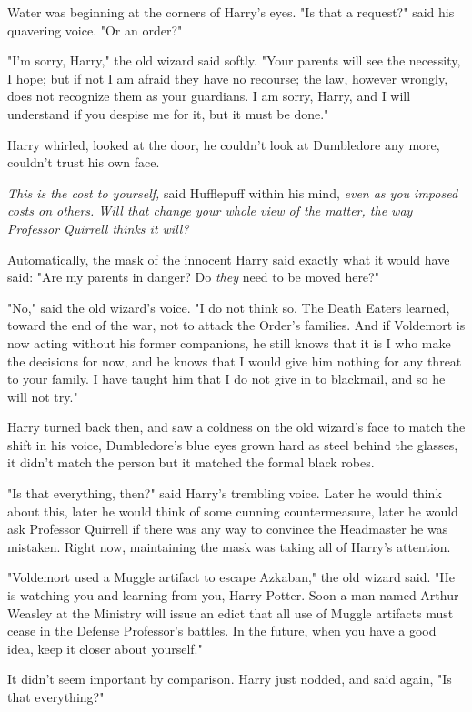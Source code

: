 Water was beginning at the corners of Harry's eyes. "Is that a request?" said
his quavering voice. "Or an order?"

"I'm sorry, Harry," the old wizard said softly. "Your parents will see the
necessity, I hope; but if not{\el} I am afraid they have no recourse; the
law, however wrongly, does not recognize them as your guardians. I am sorry,
Harry, and I will understand if you despise me for it, but it must be done."

Harry whirled, looked at the door, he couldn't look at Dumbledore any more,
couldn't trust his own face.

\emph{This is the cost to yourself,} said Hufflepuff within his mind,
\emph{even as you imposed costs on others. Will that change your whole view of
the matter, the way Professor Quirrell thinks it will?}

Automatically, the mask of the innocent Harry said exactly what it would have
said: "Are my parents in danger? Do \emph{they} need to be moved here?"

"No," said the old wizard's voice. "I do not think so. The Death Eaters
learned, toward the end of the war, not to attack the Order's families. And if
Voldemort is now acting without his former companions, he still knows that it
is I who make the decisions for now, and he knows that I would give him nothing
for any threat to your family. I have taught him that I do not give in to
blackmail, and so he will not try."

Harry turned back then, and saw a coldness on the old wizard's face to match
the shift in his voice, Dumbledore's blue eyes grown hard as steel behind the
glasses, it didn't match the person but it matched the formal black robes.

"Is that everything, then?" said Harry's trembling voice. Later he would think
about this, later he would think of some cunning countermeasure, later he would
ask Professor Quirrell if there was any way to convince the Headmaster he was
mistaken. Right now, maintaining the mask was taking all of Harry's attention.

"Voldemort used a Muggle artifact to escape Azkaban," the old wizard said. "He
is watching you and learning from you, Harry Potter. Soon a man named Arthur
Weasley at the Ministry will issue an edict that all use of Muggle artifacts
must cease in the Defense Professor's battles. In the future, when you have a
good idea, keep it closer about yourself."

It didn't seem important by comparison. Harry just nodded, and said again, "Is
that everything?"

